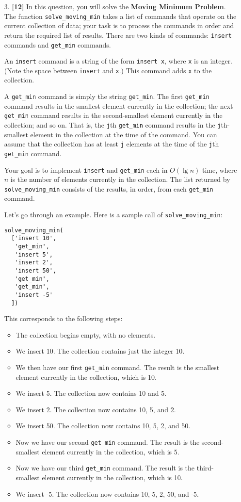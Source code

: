 \documentclass{assignment-263}
\begin{document}
\begin{enumerate}
\item[3.] \textbf{[12]} 
In this question, you will solve the {\bf Moving Minimum Problem}. The function \verb|solve_moving_min| takes a list of commands that operate on the current collection of data; your task is to process the commands in order and return the required list of results. There are two kinds of commands: \verb|insert| commands and \verb|get_min| commands.

An \verb|insert| command is a string of the form \verb|insert x|, where \verb|x| is an integer. (Note the space between \verb|insert| and \verb|x|.) This command adds \verb|x| to the collection.

A \verb|get_min| command is simply the string \verb|get_min|. The first \verb|get_min| command results in the smallest element currently in the collection; the next \verb|get_min| command results in the second-smallest element currently in the collection; and so on. That is, the \verb|j|th \verb|get_min| command results in the \verb|j|th-smallest element in the collection at the time of the command. You can assume that the collection has at least \verb|j| elements at the time of the \verb|j|th \verb|get_min| command.

Your goal is to implement \verb|insert| and \verb|get_min| each in $O(\lg n)$ time, where $n$ is the number of elements currently in the collection. The list returned by \verb|solve_moving_min| consists of the results, in order, from each \verb|get_min| command.

Let's go through an example. Here is a sample call of \verb|solve_moving_min|:

\begin{verbatim}
solve_moving_min(
  ['insert 10',
   'get_min',
   'insert 5',
   'insert 2',
   'insert 50',
   'get_min',
   'get_min',
   'insert -5'
  ])
\end{verbatim}


This corresponds to the following steps:
\begin{itemize}
\item The collection begins empty, with no elements.
\item We insert 10. The collection contains just the integer 10.
\item We then have our first \verb|get_min| command. The result is the smallest element currently in the collection, which is 10.
\item We insert 5. The collection now contains 10 and 5.
\item We insert 2. The collection now contains 10, 5, and 2.
\item We insert 50. The collection now contains 10, 5, 2, and 50.
\item Now we have our second \verb|get_min| command. The result is the second-smallest element currently in the collection, which is 5.
\item Now we have our third \verb|get_min| command. The result is the third-smallest element currently in the collection, which is 10.
\item We insert -5. The collection now contains 10, 5, 2, 50, and -5.
\end{itemize}


\end{enumerate}
\end{document}
